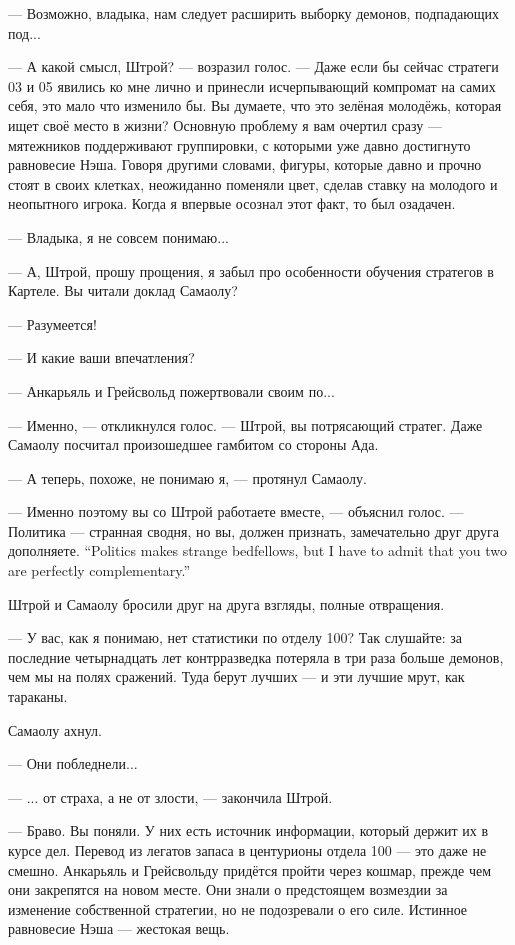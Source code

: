 --- Возможно, владыка, нам следует расширить выборку демонов, подпадающих под...

--- А какой смысл, Штрой? --- возразил голос.
--- Даже если бы сейчас стратеги 03 и 05 явились ко мне лично и принесли исчерпывающий компромат на самих себя, это мало что изменило бы.
Вы думаете, что это зелёная молодёжь, которая ищет своё место в жизни?
Основную проблему я вам очертил сразу --- мятежников поддерживают группировки, с которыми уже давно достигнуто равновесие Нэша.
Говоря другими словами, фигуры, которые давно и прочно стоят в своих клетках, неожиданно поменяли цвет, сделав ставку на молодого и неопытного игрока.
Когда я впервые осознал этот факт, то был озадачен.

--- Владыка, я не совсем понимаю...

--- А, Штрой, прошу прощения, я забыл про особенности обучения стратегов в Картеле.
Вы читали доклад Самаолу?

--- Разумеется!

--- И какие ваши впечатления?

--- Анкарьяль и Грейсвольд пожертвовали своим по...

--- Именно, --- откликнулся голос.
--- Штрой, вы потрясающий стратег.
Даже Самаолу посчитал произошедшее гамбитом со стороны Ада.

--- А теперь, похоже, не понимаю я, --- протянул Самаолу.

--- Именно поэтому вы со Штрой работаете вместе, --- объяснил голос.
{--- Политика --- странная сводня, но вы, должен признать, замечательно друг друга дополняете.}
{``Politics makes strange bedfellows, but I have to admit that you two are perfectly complementary.''}

Штрой и Самаолу бросили друг на друга взгляды, полные отвращения.

--- У вас, как я понимаю, нет статистики по отделу 100?
Так слушайте: за последние четырнадцать лет контрразведка потеряла в три раза больше демонов, чем мы на полях сражений.
Туда берут лучших --- и эти лучшие мрут, как тараканы.

Самаолу ахнул.

--- Они побледнели...

--- ... от страха, а не от злости, --- закончила Штрой.

--- Браво.
Вы поняли.
У них есть источник информации, который держит их в курсе дел.
Перевод из легатов запаса в центурионы отдела 100 --- это даже не смешно.
Анкарьяль и Грейсвольду придётся пройти через кошмар, прежде чем они закрепятся на новом месте.
Они знали о предстоящем возмездии за изменение собственной стратегии, но не подозревали о его силе.
Истинное равновесие Нэша --- жестокая вещь.

